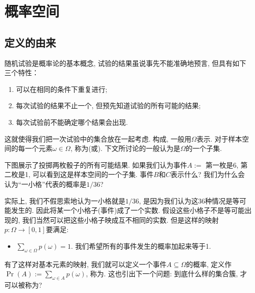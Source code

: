 \documentclass{ctexart}
\begin{document}

\section{概率空间}

\subsection{定义的由来}

随机试验是概率论的基本概念, 试验的结果虽说事先不能准确地预言, 但具有如下三个特性：

\begin{enumerate}
    \item 可以在相同的条件下重复进行;
    \item 每次试验的结果不止一个, 但预先知道试验的所有可能的结果;
    \item 每次试验前不能确定哪个结果会出现.
\end{enumerate}

这就使得我们把一次试验中的集合放在一起考虑. 构成, 一般用$\Omega$表示. 对于样本空间的每一个元素$\omega\in \Omega$, 称为(或). 下文所讨论的一般认为是$\Omega$的一个子集. 

\begin{example}
    下图展示了投掷两枚骰子的所有可能结果. 如果我们认为事件$A:=$ 第一枚是6, 第二枚是1, 可以看到这是样本空间的一个子集. 事件$B$和$C$表示什么? 我们为什么会认为``一小格''代表的概率是$1/36$?

\end{example}

实际上, 我们不假思索地认为一小格就是$1/36$, 是因为我们认为这36种情况是等可能发生的. 因此将某一个小格子(事件)成了一个实数. 假设这些小格子不是等可能出现的, 我们当然可以把这些小格子映成互不相同的实数. 但是这样的映射$p:\Omega\to [0,1]$要满足:

\begin{itemize}
    \item $\sum_{\omega \in \Omega} p(\omega)=1$. 我们希望所有的事件发生的概率加起来等于1. 
\end{itemize}

有了这样对基本元素的映射, 我们就可以定义一个事件$A \subseteq \Omega$的概率, 定义作$\operatorname{Pr}(A):=\sum_{\omega \in A} p(\omega)$, 称为. 这也引出下一个问题: 到底什么样的集合簇, 才可以被称为?
\end{document}
